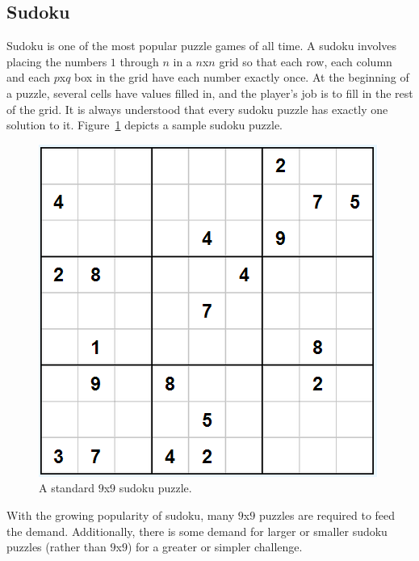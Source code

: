     \subsection{Sudoku}
    Sudoku is one of the most popular puzzle games of all time. A sudoku involves placing the numbers $1$ through $n$ in
    a $n$x$n$ grid so that each row, each column and each $p$x$q$ box in the grid have each number exactly once. At the beginning of
    a puzzle, several cells have values filled in, and the player's job is to fill in the rest of the grid. It is always
    understood that every sudoku puzzle has exactly one solution to it. Figure~\ref{fig:sudoku} depicts a sample sudoku puzzle.
    \begin{figure}[H]
        \centering
        \includegraphics[scale=0.70]{sudoku.png}
        \caption{A standard $9$x$9$ sudoku puzzle.}
        \label{fig:sudoku}
    \end{figure}
    
    With the growing popularity of sudoku, many $9$x$9$ puzzles are required to feed the demand. Additionally, there is some demand
    for larger or smaller sudoku puzzles (rather than $9$x$9$) for a greater or simpler challenge.

